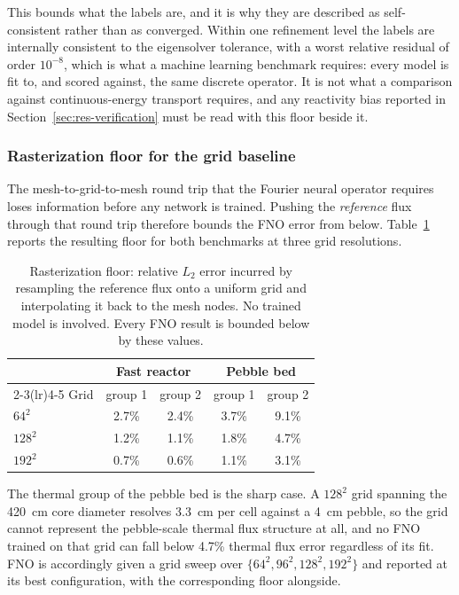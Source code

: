 \documentclass[preprint,12pt]{elsarticle}
\begin{document}
This bounds what the labels are, and it is why they are described as
self-consistent rather than as converged. Within one refinement level the
labels are internally consistent to the eigensolver tolerance, with a worst
relative residual of order $10^{-8}$, which is what a machine learning
benchmark requires: every model is fit to, and scored against, the same
discrete operator. It is not what a comparison against continuous-energy
transport requires, and any reactivity bias reported in
Section~\ref{sec:res-verification} must be read with this floor beside it.

\subsubsection{Rasterization floor for the grid baseline}
\label{sec:res-rasterfloor}

The mesh-to-grid-to-mesh round trip that the Fourier neural operator requires
loses information before any network is trained. Pushing the \emph{reference}
flux through that round trip therefore bounds the FNO error from below.
Table~\ref{tab:rasterfloor} reports the resulting floor for both benchmarks at
three grid resolutions.

\begin{table}[htbp]
\centering
\caption{Rasterization floor: relative $L_2$ error incurred by resampling the
reference flux onto a uniform grid and interpolating it back to the mesh nodes.
No trained model is involved. Every FNO result is bounded below by these
values.}
\label{tab:rasterfloor}
\begin{tabular}{@{}lcccc@{}}
\toprule
& \multicolumn{2}{c}{Fast reactor} & \multicolumn{2}{c}{Pebble bed} \\
\cmidrule(lr){2-3}\cmidrule(lr){4-5}
Grid & group 1 & group 2 & group 1 & group 2 \\
\midrule
$64^2$  & 2.7\% & 2.4\% & 3.7\% & 9.1\% \\
$128^2$ & 1.2\% & 1.1\% & 1.8\% & 4.7\% \\
$192^2$ & 0.7\% & 0.6\% & 1.1\% & 3.1\% \\
\bottomrule
\end{tabular}
\end{table}

The thermal group of the pebble bed is the sharp case. A $128^2$ grid spanning
the 420~cm core diameter resolves 3.3~cm per cell against a 4~cm pebble, so the
grid cannot represent the pebble-scale thermal flux structure at all, and no
FNO trained on that grid can fall below 4.7\% thermal flux error regardless of
its fit. FNO is accordingly given a grid sweep over $\{64^2, 96^2, 128^2,
192^2\}$ and reported at its best configuration, with the corresponding floor
alongside.
\end{document}
